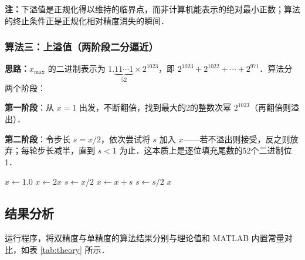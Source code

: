 \documentclass[UTF8,a4paper,11pt]{article}
\newcommand*{\rmk}{\textbf{注：}}
\newcommand\e{\leftarrow}
\begin{document}
\rmk 下溢值是正规化得以维持的临界点，而非计算机能表示的绝对最小正数；算法的终止条件正是正规化相对精度消失的瞬间．

\subsubsection*{算法三：上溢值（两阶段二分逼近）}

\textbf{思路：}$x_{\max}$ 的二进制表示为 $1.\underbrace{11\cdots1}_{52}\times 2^{1023}$，即 $2^{1023}+2^{1022}+\cdots+2^{971}$．算法分两个阶段：

\textbf{第一阶段}：从 $x=1$ 出发，不断翻倍，找到最大的2的整数次幂 $2^{1023}$（再翻倍则溢出）．

\textbf{第二阶段}：令步长 $s = x/2$，依次尝试将 $s$ 加入 $x$——若不溢出则接受，反之则放弃；每轮步长减半，直到 $s < 1$ 为止．这本质上是逐位填充尾数的52个二进制位1．

\begin{algorithm}[H]
    \caption{求上溢值（两阶段）}
    \begin{algorithmic}[1]
        \State $x \e 1.0$
            \State $x \e 2x$ 
        \EndWhile
        \State $s \e x/2$
                \State $x \e x + s$ 
            \EndIf
            \State $s \e s/2$
        \EndWhile
        \State \Return $x$
    \end{algorithmic}
\end{algorithm}

\subsection{结果分析}

运行程序，将双精度与单精度的算法结果分别与理论值和 MATLAB 内置常量对比，如表 \ref{tab:theory} 所示．
\end{document}
